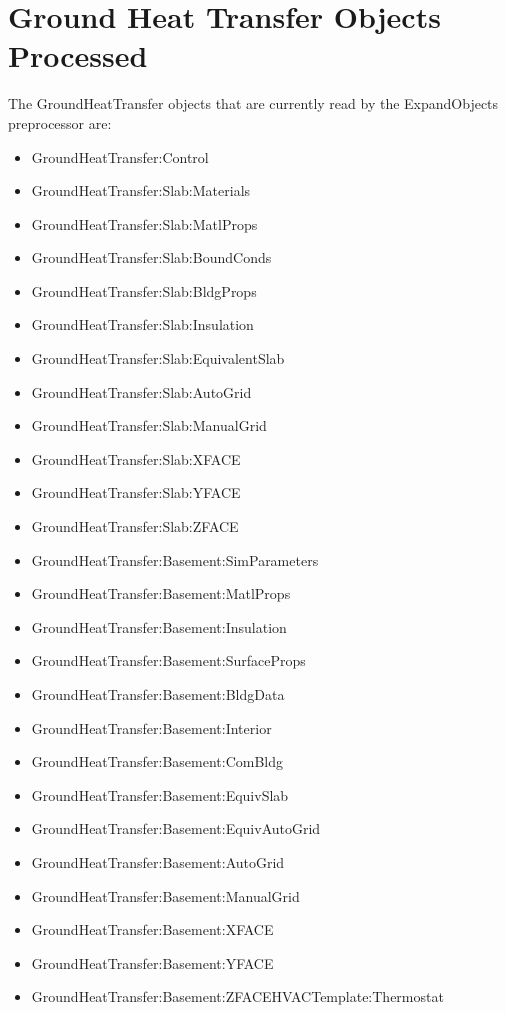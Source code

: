 \section{Ground Heat Transfer Objects Processed}\label{ground-heat-transfer-objects-processed}

The GroundHeatTransfer objects that are currently read by the ExpandObjects preprocessor are:

\begin{itemize}
\item
  GroundHeatTransfer:Control
\item
  GroundHeatTransfer:Slab:Materials
\item
  GroundHeatTransfer:Slab:MatlProps
\item
  GroundHeatTransfer:Slab:BoundConds
\item
  GroundHeatTransfer:Slab:BldgProps
\item
  GroundHeatTransfer:Slab:Insulation
\item
  GroundHeatTransfer:Slab:EquivalentSlab
\item
  GroundHeatTransfer:Slab:AutoGrid
\item
  GroundHeatTransfer:Slab:ManualGrid
\item
  GroundHeatTransfer:Slab:XFACE
\item
  GroundHeatTransfer:Slab:YFACE
\item
  GroundHeatTransfer:Slab:ZFACE
\item
  GroundHeatTransfer:Basement:SimParameters
\item
  GroundHeatTransfer:Basement:MatlProps
\item
  GroundHeatTransfer:Basement:Insulation
\item
  GroundHeatTransfer:Basement:SurfaceProps
\item
  GroundHeatTransfer:Basement:BldgData
\item
  GroundHeatTransfer:Basement:Interior
\item
  GroundHeatTransfer:Basement:ComBldg
\item
  GroundHeatTransfer:Basement:EquivSlab
\item
  GroundHeatTransfer:Basement:EquivAutoGrid
\item
  GroundHeatTransfer:Basement:AutoGrid
\item
  GroundHeatTransfer:Basement:ManualGrid
\item
  GroundHeatTransfer:Basement:XFACE
\item
  GroundHeatTransfer:Basement:YFACE
\item
  GroundHeatTransfer:Basement:ZFACEHVACTemplate:Thermostat
\end{itemize}
